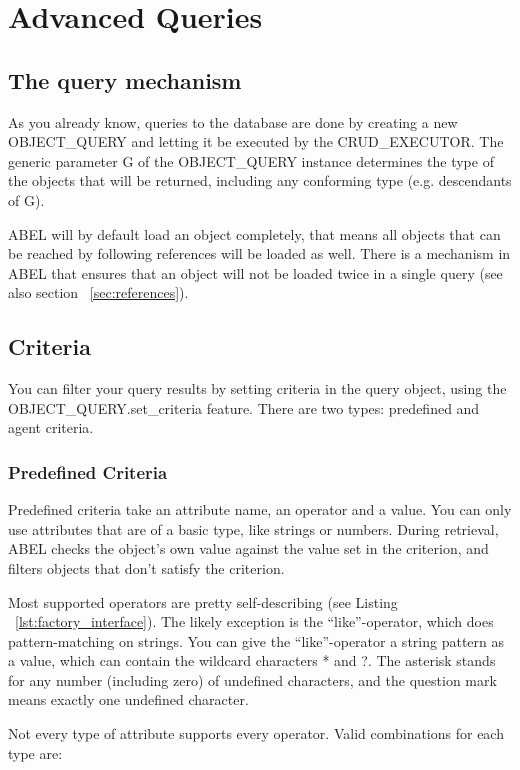 \section{Advanced Queries}
\label{sec:query}

\subsection{The query mechanism}

As you already know, queries to the database are done by creating a new OBJECT\_QUERY and letting it be executed by the CRUD\_EXECUTOR.
The generic parameter G of the OBJECT\_QUERY instance determines the type of the objects that will be returned, including any conforming type (e.g. descendants of G).

ABEL will by default load an object completely, that means all objects that can be reached by following references will be loaded as well. 
There is a mechanism in ABEL that ensures that an object will not be loaded twice in a single query (see also section ~\ref{sec:references}).


\subsection{Criteria}

You can filter your query results by setting criteria in the query object, using the OBJECT\_QUERY.set\_criteria feature.
There are two types: predefined and agent criteria.

\subsubsection{Predefined Criteria}
Predefined criteria take an attribute name, an operator and a value. 
You can only use attributes that are of a basic type, like strings or numbers.
During retrieval, ABEL checks the object's own value against the value set in the criterion, and filters objects that don't satisfy the criterion.

Most supported operators are pretty self-describing (see Listing ~\ref{lst:factory_interface}).
The likely exception is the ``like''-operator, which does pattern-matching on strings.
You can give the ``like''-operator a string pattern as a value, which can contain the wildcard characters * and ?.
The asterisk stands for any number (including zero) of undefined characters, and the question mark means exactly one undefined character.

Not every type of attribute supports every operator. Valid combinations for each type are:

